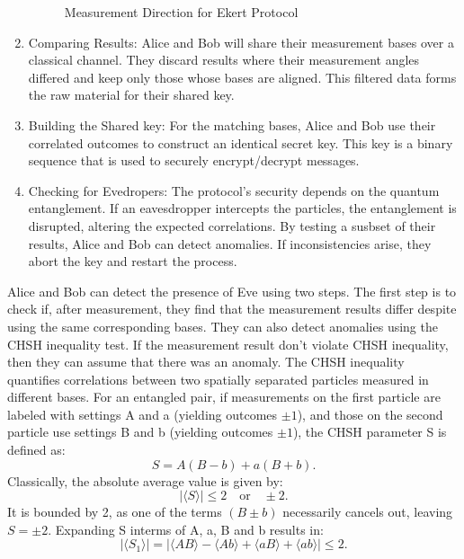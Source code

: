 \documentclass{article}
\begin{document}
\begin{enumerate}
          \begin{figure}[!h]
              \centering
              
              \caption{Measurement Direction for Ekert Protocol\cite{wolf2021quantum}}
              \label{fig:mesurement_direction}
          \end{figure}

    \item Comparing Results:  Alice and Bob will share their measurement bases over a classical channel. They discard results where their measurement angles differed and keep only those whose bases are aligned. This filtered data forms the raw material for their shared key.
    \item Building the Shared key: For the matching bases, Alice and Bob use their correlated outcomes to construct an identical secret key. This key is a binary sequence that is used to securely encrypt/decrypt messages.
    \item Checking for Evedropers: The protocol's security depends on the quantum entanglement. If an eavesdropper intercepts the particles, the entanglement is disrupted, altering the expected correlations. By testing a susbset of their results, Alice and Bob can detect anomalies. If inconsistencies arise, they abort the key and restart the process.
\end{enumerate}

Alice and Bob can detect the presence of Eve using two steps. The first step is to check if, after measurement, they find that the measurement results differ despite using the same corresponding bases. They can also detect anomalies using the CHSH inequality test. If the measurement result don't violate CHSH inequality, then they can assume that there was an anomaly.
The CHSH inequality quantifies correlations between two spatially separated particles measured in different bases. For an entangled pair, if measurements on the first particle are labeled with settings A and a (yielding outcomes $ \pm 1 $), and those on the second particle use settings B and b (yielding outcomes $ \pm 1 $), the CHSH parameter S is defined as:
\[
    S = A(B - b) + a(B + b).
\]
Classically, the absolute average value is given by:
\[
    |\langle S \rangle| \leq 2 \quad \text{or} \quad \pm 2.
\]
It is bounded by 2, as one of the terms \( (B \pm b) \) necessarily cancels out, leaving \( S = \pm 2 \).
Expanding S interms of A, a, B and b results in: \[
    \left| \langle S_1 \rangle \right| = \left| \langle AB \rangle - \langle Ab \rangle + \langle aB \rangle + \langle ab \rangle \right| \leq 2.
\]
\end{document}

